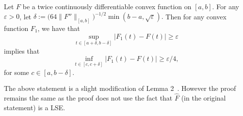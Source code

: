 \begin{lemma}\label{lem:Dumbgen_lemma}
Let $F$ be a twice continuously differentiable convex function on $[a,b].$ For any $\varepsilon >0$, let $\delta :=   \big(64 \|F''\|_{[a,b]}\big)^{-1/2}\min(b-a, \sqrt{\varepsilon}).$ Then  for any convex function $F_1$, we have that 
\begin{equation}\label{eq:part_1_dumb}
\sup_{t \in [a+\delta, b-\delta]} |F_1(t) -F(t)| \ge \varepsilon
\end{equation}
implies that 
\begin{equation}\label{eq:part_2_dumb}
\inf_{t \in [c, c+\delta]} |F_1(t) -F(t)| \ge \varepsilon/4,
\end{equation}
for some  $c \in [a,b-\delta].$
\end{lemma}
\begin{remark}\label{rem:DumbgenLemma}
The above statement is a slight modification of Lemma 2~\cite{DumbgenEtAL04}. However the proof remains the same as the proof does not use the fact that $\hat{F}$ (in the original statement) is a LSE.
\end{remark}




